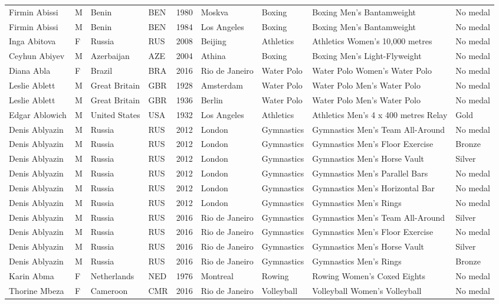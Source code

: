 \documentclass{article}%
\begin{document}
\begin{longtable}{p{1.5cm} p{0.5cm} p{2cm} p{1cm} p{1cm} p{1.5cm} p{1.5cm} p{5cm} p{1.5cm}}
Firmin Abissi&M&Benin&BEN&1980&Moskva&Boxing&Boxing Men's Bantamweight&No medal\\%
Firmin Abissi&M&Benin&BEN&1984&Los Angeles&Boxing&Boxing Men's Bantamweight&No medal\\%
Inga Abitova&F&Russia&RUS&2008&Beijing&Athletics&Athletics Women's 10,000 metres&No medal\\%
Ceyhun Abiyev&M&Azerbaijan&AZE&2004&Athina&Boxing&Boxing Men's Light{-}Flyweight&No medal\\%
Diana Abla&F&Brazil&BRA&2016&Rio de Janeiro&Water Polo&Water Polo Women's Water Polo&No medal\\%
Leslie Ablett&M&Great Britain&GBR&1928&Amsterdam&Water Polo&Water Polo Men's Water Polo&No medal\\%
Leslie Ablett&M&Great Britain&GBR&1936&Berlin&Water Polo&Water Polo Men's Water Polo&No medal\\%
Edgar Ablowich&M&United States&USA&1932&Los Angeles&Athletics&Athletics Men's 4 x 400 metres Relay&Gold\\%
Denis Ablyazin&M&Russia&RUS&2012&London&Gymnastics&Gymnastics Men's Team All{-}Around&No medal\\%
Denis Ablyazin&M&Russia&RUS&2012&London&Gymnastics&Gymnastics Men's Floor Exercise&Bronze\\%
Denis Ablyazin&M&Russia&RUS&2012&London&Gymnastics&Gymnastics Men's Horse Vault&Silver\\%
Denis Ablyazin&M&Russia&RUS&2012&London&Gymnastics&Gymnastics Men's Parallel Bars&No medal\\%
Denis Ablyazin&M&Russia&RUS&2012&London&Gymnastics&Gymnastics Men's Horizontal Bar&No medal\\%
Denis Ablyazin&M&Russia&RUS&2012&London&Gymnastics&Gymnastics Men's Rings&No medal\\%
Denis Ablyazin&M&Russia&RUS&2016&Rio de Janeiro&Gymnastics&Gymnastics Men's Team All{-}Around&Silver\\%
Denis Ablyazin&M&Russia&RUS&2016&Rio de Janeiro&Gymnastics&Gymnastics Men's Floor Exercise&No medal\\%
Denis Ablyazin&M&Russia&RUS&2016&Rio de Janeiro&Gymnastics&Gymnastics Men's Horse Vault&Silver\\%
Denis Ablyazin&M&Russia&RUS&2016&Rio de Janeiro&Gymnastics&Gymnastics Men's Rings&Bronze\\%
Karin Abma&F&Netherlands&NED&1976&Montreal&Rowing&Rowing Women's Coxed Eights&No medal\\%
Thorine Mbeza&F&Cameroon&CMR&2016&Rio de Janeiro&Volleyball&Volleyball Women's Volleyball&No medal\\%

\end{longtable}
\end{document}
